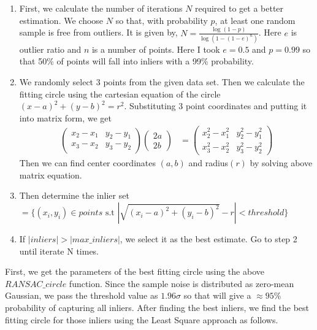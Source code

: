 \documentclass[a4paper]{article}
\begin{document}
\begin{enumerate}
  \item First, we calculate the number of iterations $N$ required to get a better estimation. We choose $N$ 
  so that, with probability $p$, at least one random sample is free from outliers.
  It is given by, $N=\frac{\log{(1-p)}}{\log{(1-(1-e)^n)}}$. Here $e$ is outlier
  ratio and $n$ is a number of points. Here I took $e=0.5$ and $p=0.99$ so 
  that 50\% of points will fall into inliers with a 99\% probability.
  \item We randomly select 3 points from the given data set. Then we calculate the fitting
   circle using the cartesian equation of the circle $(x-a)^2+(y-b)^2=r^2$. Substituting
    3 point coordinates and putting it into matrix form, we get
   \begin{align*}
     \begin{pmatrix}
       x_2-x_1 & y_2-y_1\\
       x_3-x_2 & y_3-y_2
     \end{pmatrix}
     \begin{pmatrix}
       2a\\
       2b
     \end{pmatrix}&=
     \begin{pmatrix}
      x_2^2-x_1^2 & y_2^2-y_1^2\\
      x_3^2-x_2^2 & y_3^2-y_2^2
    \end{pmatrix}
   \end{align*}
   Then we can find center coordinates $(a, b)$ and radius$(r)$ by solving above matrix equation.
   \item Then determine the inlier set 
   $=\{(x_i,y_i)\in points \text{ s.t }|\sqrt{(x_i-a)^2+(y_i-b)^2}-r|<threshold\}$
   \item If $|inliers|>|max\_inliers|$, we select it as the best estimate. Go to step 2
   until iterate N times.
  \end{enumerate}
First, we get the parameters of the best fitting circle using the above 
$RANSAC\_circle$ function. Since the sample noise is distributed as zero-mean
 Gaussian, we pass the threshold value as $1.96\sigma$ so that will give
  a $\approx95\%$ probability of capturing all inliers. After
   finding the best inliers, we find the best fitting circle for
    those inliers using the Least Square approach as follows.
\end{document}
